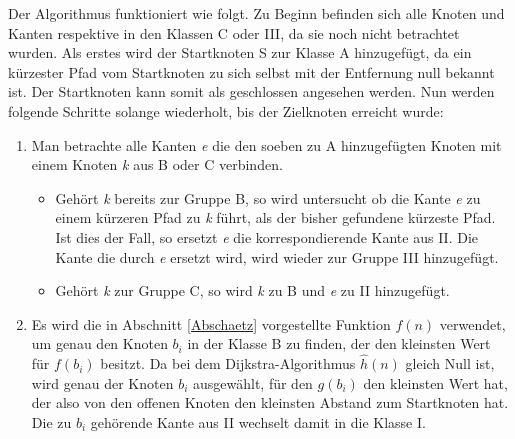 		Der Algorithmus funktioniert wie folgt. Zu Beginn befinden sich alle Knoten und Kanten respektive in den Klassen C oder III, da sie noch nicht betrachtet wurden. Als erstes wird der Startknoten S zur Klasse A hinzugefügt, da ein kürzester Pfad vom Startknoten zu sich selbst mit der Entfernung null bekannt ist. Der Startknoten kann somit als geschlossen angesehen werden. Nun werden folgende Schritte solange wiederholt, bis der Zielknoten erreicht wurde:
		\begin{center}
			\begin{minipage}{0.8\linewidth}

				\begin{enumerate}
					\item Man betrachte alle Kanten \textit{e} die den soeben zu A hinzugefügten Knoten mit einem Knoten \textit{k} aus B oder C verbinden. 
					\begin{itemize}
						\item Gehört \textit{k} bereits zur Gruppe B, so wird untersucht ob die Kante \textit{e} zu einem kürzeren Pfad zu \textit{k} führt, als der bisher gefundene kürzeste Pfad. Ist dies der Fall, so ersetzt \textit{e} die korrespondierende Kante aus II. Die Kante die durch \textit{e} ersetzt wird, wird wieder zur Gruppe III hinzugefügt.
						\item Gehört \textit{k} zur Gruppe  C, so wird \textit{k} zu B und \textit{e} zu II hinzugefügt.
					\end{itemize}
					\item Es wird die in Abschnitt \ref{Abschaetz} vorgestellte Funktion $f(n)$ verwendet, um genau den Knoten $b_i$ in der Klasse B zu finden, der den kleinsten Wert für $f(b_i)$ besitzt. Da bei dem Dijkstra-Algorithmus $\hat{h}(n)$ gleich Null ist, wird genau der Knoten  $b_i$ ausgewählt, für den $g(b_i)$ den kleinsten Wert hat, der also von den offenen Knoten den kleinsten Abstand zum Startknoten hat. Die zu $b_i$ gehörende Kante  aus II wechselt damit in die Klasse I.
				\end{enumerate}
				
			\end{minipage}
		\end{center}
